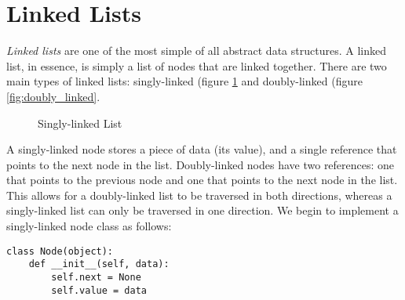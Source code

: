 \section*{Linked Lists}
\emph{Linked lists} are one of the most simple of all abstract data structures.
A linked list, in essence, is simply a list of nodes that are linked together.
There are two main types of linked lists: singly-linked (figure \ref{fig:singly_linked} and doubly-linked (figure \ref{fig:doubly_linked}.

\begin{figure}
\centering
{}
\caption{Singly-linked List}
\label{fig:singly_linked}
\end{figure}


A singly-linked node stores a piece of data (its value), and a single reference that points to the next node in the list.
Doubly-linked nodes have two references: one that points to the previous node and one that points to the next node in the list.
This allows for a doubly-linked list to be traversed in both directions, whereas a singly-linked list can only be traversed in one direction.
We begin to implement a singly-linked node class as follows:
\begin{lstlisting}
class Node(object):
    def __init__(self, data):
        self.next = None
        self.value = data
\end{lstlisting}

